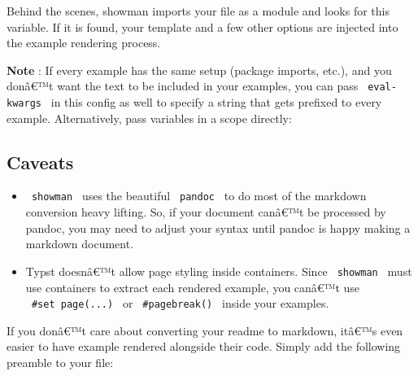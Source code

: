 Behind the scenes, showman imports your file as a module and looks for
this variable. If it is found, your template and a few other options are
injected into the example rendering process.

\textbf{Note} : If every example has the same setup (package imports,
etc.), and you donâ€™t want the text to be included in your examples,
you can pass \texttt{\ eval-kwargs\ } in this config as well to specify
a string that gets prefixed to every example. Alternatively, pass
variables in a scope directly:

\begin{Shaded}
\begin{Highlighting}[]
\NormalTok{  ),}
\NormalTok{)}
\end{Highlighting}
\end{Shaded}

\subsection{Caveats}\label{caveats}

\begin{itemize}
\item
  \texttt{\ showman\ } uses the beautiful \texttt{\ pandoc\ } to do most
  of the markdown conversion heavy lifting. So, if your document canâ€™t
  be processed by pandoc, you may need to adjust your syntax until
  pandoc is happy making a markdown document.
\item
  Typst doesnâ€™t allow page styling inside containers. Since
  \texttt{\ showman\ } must use containers to extract each rendered
  example, you canâ€™t use \texttt{\ \#set\ page(...)\ } or
  \texttt{\ \#pagebreak()\ } inside your examples.
\end{itemize}

If you donâ€™t care about converting your readme to markdown, itâ€™s
even easier to have example rendered alongside their code. Simply add
the following preamble to your file:

